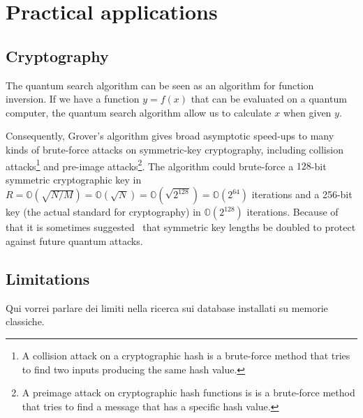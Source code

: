 \section{Practical applications}
\subsection{Cryptography}
The quantum search algorithm can be seen as an algorithm for function inversion. If we have a function $y=f(x)$ that can be evaluated on a quantum computer, the quantum search algorithm allow us to calculate $x$ when given $y$.

Consequently, Grover's algorithm gives broad asymptotic speed-ups to many kinds of brute-force attacks on symmetric-key cryptography, including collision attacks\footnote{A collision attack on a cryptographic hash is a brute-force method that tries to find two inputs producing the same hash value.} and pre-image attacks\footnote{A preimage attack on cryptographic hash functions is is a brute-force method that tries to find a message that has a specific hash value.}.
The algorithm could brute-force a $128$-bit symmetric cryptographic key in $R = \mathbb{O} (\sqrt{N/M}) = \mathbb{O} (\sqrt{N}) = \mathbb{O} (\sqrt{2^{128}}) = \mathbb{O} (2^{64})$ iterations and a 256-bit key (the actual standard for cryptography) in $\mathbb{O} (2^{128})$ iterations. Because of that  it is sometimes suggested~\cite{10.1007/978-3-642-12929-2_6} that symmetric key lengths be doubled to protect against future quantum attacks.

\subsection{Limitations}
Qui vorrei parlare dei limiti nella ricerca sui database installati su memorie classiche.